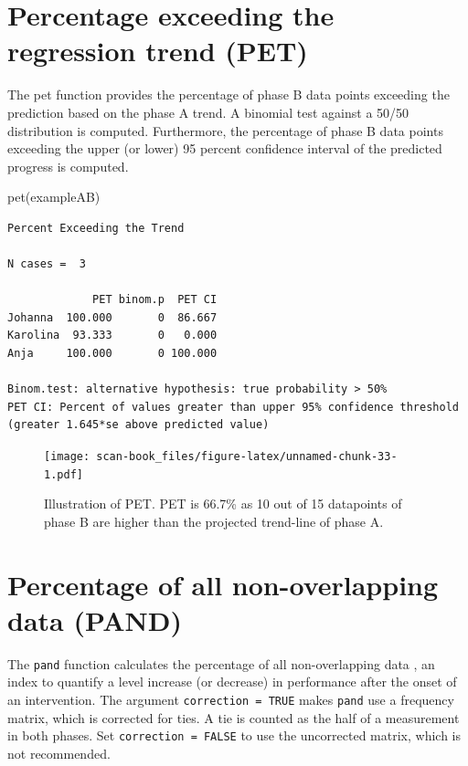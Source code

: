 \documentclass[
]{book}
\newenvironment{Shaded}{\begin{snugshade}}{\end{snugshade}}
\newcommand{\FunctionTok}[1]{\textcolor[rgb]{0.00,0.00,0.00}{#1}}
\newcommand{\NormalTok}[1]{#1}
\begin{document}
\hypertarget{percentage-exceeding-the-regression-trend-pet}{%
\section{Percentage exceeding the regression trend (PET)}\label{percentage-exceeding-the-regression-trend-pet}}

The pet function provides the percentage of phase B data points exceeding the prediction based on the phase A trend. A binomial test against a 50/50 distribution is computed. Furthermore, the percentage of phase B data points exceeding the upper (or lower) 95 percent confidence interval of the predicted progress is computed.

\begin{Shaded}
\begin{Highlighting}[]
\FunctionTok{pet}\NormalTok{(exampleAB)}
\end{Highlighting}
\end{Shaded}

\begin{verbatim}
Percent Exceeding the Trend

N cases =  3 

             PET binom.p  PET CI
Johanna  100.000       0  86.667
Karolina  93.333       0   0.000
Anja     100.000       0 100.000

Binom.test: alternative hypothesis: true probability > 50%
PET CI: Percent of values greater than upper 95% confidence threshold (greater 1.645*se above predicted value)
\end{verbatim}

\begin{figure}
\centering
\texttt{[image: scan-book\_files/figure-latex/unnamed-chunk-33-1.pdf]}
\caption{\label{fig:unnamed-chunk-33}Illustration of PET. PET is 66.7\% as 10 out of 15 datapoints of phase B are higher than the projected trend-line of phase A.}
\end{figure}

\hypertarget{percentage-of-all-non-overlapping-data-pand}{%
\section{Percentage of all non-overlapping data (PAND)}\label{percentage-of-all-non-overlapping-data-pand}}

The \texttt{pand} function calculates the percentage of all non-overlapping data \citep{parker_percentage_2007}, an index to quantify a level increase (or decrease) in performance after the onset of an intervention. The argument \texttt{correction\ =\ TRUE} makes \texttt{pand} use a frequency matrix, which is corrected for ties. A tie is counted as the half of a measurement in both phases. Set \texttt{correction\ =\ FALSE} to use the uncorrected matrix, which is not recommended.
\end{document}
